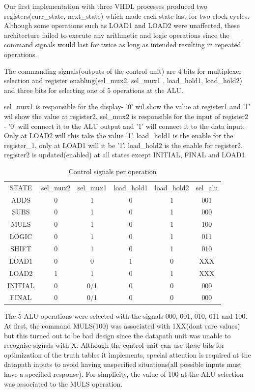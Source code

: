 \documentclass[12pt]{article}
\begin{document}
Our first implementation with three VHDL processes produced two registers(curr\_state, next\_state) which made each state last for two clock cycles. Although some operations such as LOAD1 and LOAD2 were unaffected, these architecture failed to execute any arithmetic and logic operations since the command signals would last for twice as long as intended resulting in repeated operations.

The commanding signals(outputs of the control unit) are 4 bits for multiplexer selection and register enabling(sel\_mux2, sel\_mux1 , load\_hold1, load\_hold2) and three bits for selecting one of 5 operations at the ALU.

sel\_mux1 is responsible for the display- '0' wil show the value at register1 and '1' wil show the value at register2.
sel\_mux2 is responsible for the input of register2 - '0' will connect it to the ALU output and '1' will connect it to the data input. Only at LOAD2 will this take the value '1'. load\_hold1 is the enable for the register\_1, only at LOAD1 will it be '1'. load\_hold2 is the enable for register2. register2 is updated(enabled) at all states except INITIAL, FINAL and LOAD1.


\begin{table}[H]
	\centering
	\begin{tabular}{cccccc}
		STATE & sel\_mux2 & sel\_mux1 & load\_hold1 & load\_hold2 & sel\_alu\\
		ADDS    & 0 & 1 & 0 & 1 & 001\\
		SUBS    & 0 & 1 & 0 & 1 & 000\\
		MULS    & 0 & 1 & 0 & 1 & 100\\
		LOGIC   & 0 & 1 & 0 & 1 & 011\\
		SHIFT   & 0 & 1 & 0 & 1 & 010\\
		LOAD1   & 0 & 0 & 1 & 0 & XXX\\
		LOAD2   & 1 & 1 & 0 & 1 & XXX\\
		INITIAL & 0 & 0/1 & 0 & 0 & 000\\
		FINAL   & 0 & 0/1 & 0 & 0 & 000\\
	\end{tabular}
	\caption{Control signals per operation}
	\label{tab:my_label}
\end{table}

The 5 ALU operations were selected with the signals 000, 001, 010, 011 and 100. At first, the command MULS(100) was associated with 1XX(dont care values) but this turned out to be bad design since the datapath unit was unable to recognise signals with X. Although the control unit can use these bits for optimization of the truth tables it implements, special attention is required at the datapath inputs to avoid having unspecified situations(all possible inputs must have a specified response). For simplicity, the value of 100 at the ALU selection was associated to the MULS operation.
\end{document}

